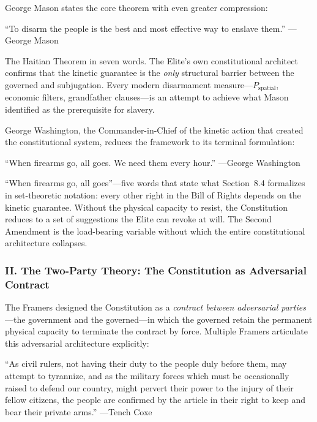 George Mason states the core theorem with even greater compression:

\begin{historicalsource}
``To disarm the people is the best and most effective way to enslave them.'' \hfill ---George Mason
\end{historicalsource}

The Haitian Theorem in seven words. The Elite's own constitutional architect confirms that the kinetic guarantee is the \textit{only} structural barrier between the governed and subjugation. Every modern disarmament measure---$P_{\text{spatial}}$, economic filters, grandfather clauses---is an attempt to achieve what Mason identified as the prerequisite for slavery.

George Washington, the Commander-in-Chief of the kinetic action that created the constitutional system, reduces the framework to its terminal formulation:

\begin{historicalsource}
``When firearms go, all goes. We need them every hour.'' \hfill ---George Washington
\end{historicalsource}

``When firearms go, all goes''---five words that state what Section~8.4 formalizes in set-theoretic notation: every other right in the Bill of Rights depends on the kinetic guarantee. Without the physical capacity to resist, the Constitution reduces to a set of suggestions the Elite can revoke at will. The Second Amendment is the load-bearing variable without which the entire constitutional architecture collapses.

\subsubsection*{II. The Two-Party Theory: The Constitution as Adversarial Contract}

The Framers designed the Constitution as a \textit{contract between adversarial parties}---the government and the governed---in which the governed retain the permanent physical capacity to terminate the contract by force. Multiple Framers articulate this adversarial architecture explicitly:

\begin{historicalsource}
``As civil rulers, not having their duty to the people duly before them, may attempt to tyrannize, and as the military forces which must be occasionally raised to defend our country, might pervert their power to the injury of their fellow citizens, the people are confirmed by the article in their right to keep and bear their private arms.'' \hfill ---Tench Coxe
\end{historicalsource}

